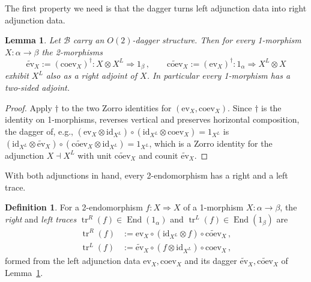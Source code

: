 \documentclass[11pt]{article}
\newtheorem{lemma}[theorem]{Lemma}
\theoremstyle{definition}
\newtheorem{definition}[theorem]{Definition}
\newcommand{\cB}{\mathcal{B}}
\newcommand{\Or}{O} %
\newcommand{\dg}{\dagger}
\begin{document}
The first property we need is that the dagger turns left adjunction data into right adjunction data.

\begin{lemma}
\label{lem:abstractunitaryduality}
Let $\cB$ carry an $\Or(2)$-dagger structure. Then for every 1-morphism $X \colon \alpha \to \beta$ the 2-morphisms
\begin{equation}
  \widetilde{\mathrm{ev}}_X := (\mathrm{coev}_X)^\dg \colon X \otimes X^L \Longrightarrow 1_\beta \, ,
  \qquad
  \widetilde{\mathrm{coev}}_X := (\mathrm{ev}_X)^\dg \colon 1_\alpha \Longrightarrow X^L \otimes X
\end{equation}
exhibit $X^L$ also as a \emph{right} adjoint of $X$. In particular every 1-morphism has a two-sided adjoint.
\end{lemma}

\begin{proof}
Apply $\dg$ to the two Zorro identities for $(\mathrm{ev}_X, \mathrm{coev}_X)$. Since $\dg$ is the identity on 1-morphisms, reverses vertical and preserves horizontal composition, the dagger of, e.g., $(\mathrm{ev}_X \otimes \mathrm{id}_{X^L}) \circ (\mathrm{id}_{X^L} \otimes \mathrm{coev}_X) = 1_{X^L}$ is $(\mathrm{id}_{X^L} \otimes \widetilde{\mathrm{ev}}_X) \circ (\widetilde{\mathrm{coev}}_X \otimes \mathrm{id}_{X^L}) = 1_{X^L}$, which is a Zorro identity for the adjunction $X \dashv X^L$ with unit $\widetilde{\mathrm{coev}}_X$ and counit $\widetilde{\mathrm{ev}}_X$.
\end{proof}

With both adjunctions in hand, every 2-endomorphism has a right and a left trace.

\begin{definition}
\label{def:traces}
For a 2-endomorphism $f \colon X \Rightarrow X$ of a 1-morphism $X \colon \alpha \to \beta$, the \emph{right} and \emph{left traces} $\operatorname{tr}^R(f) \in \operatorname{End}(1_\alpha)$ and $\operatorname{tr}^L(f) \in \operatorname{End}(1_\beta)$ are
\begin{align}
  \operatorname{tr}^R(f) &:= \mathrm{ev}_X \circ (\mathrm{id}_{X^L} \otimes f) \circ \widetilde{\mathrm{coev}}_X \, , \\
  \operatorname{tr}^L(f) &:= \widetilde{\mathrm{ev}}_X \circ (f \otimes \mathrm{id}_{X^L}) \circ \mathrm{coev}_X \, ,
\end{align}
formed from the left adjunction data $\mathrm{ev}_X, \mathrm{coev}_X$ and its dagger $\widetilde{\mathrm{ev}}_X, \widetilde{\mathrm{coev}}_X$ of Lemma~\ref{lem:abstractunitaryduality}.
\end{definition}
\end{document}
